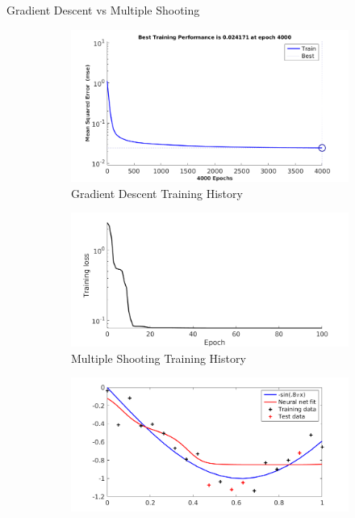 \documentclass[11pt,t]{beamer}
\begin{document}
\begin{frame}[fragile]{Gradient Descent vs Multiple Shooting}
\begin{figure}
     \centering
     \begin{subfigure}[b]{0.45\textwidth}
         \centering
         \includegraphics[width=\textwidth]{gdtrain}
         \caption*{\footnotesize Gradient Descent Training History}
         \label{gdtrain}
     \end{subfigure}
     \begin{subfigure}[b]{0.45\textwidth}
         \centering
         \includegraphics[width=\textwidth]{fmintrain}
         \caption*{\footnotesize Multiple Shooting Training History}
         \label{fmintrain}
     \end{subfigure}
     \begin{subfigure}[b]{0.49\textwidth}
         \centering
         \includegraphics[width=\textwidth]{gdfit}

\end{subfigure}
\end{figure}
\end{frame}
\end{document}
